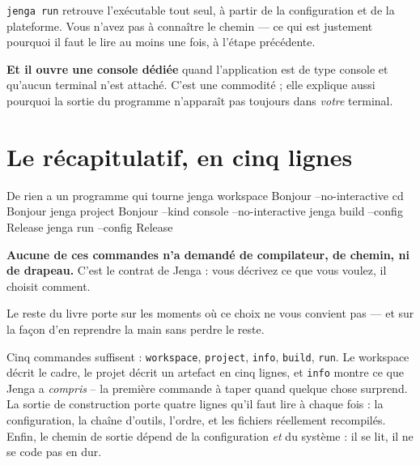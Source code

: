 \begin{nkretenir}
\texttt{jenga run} retrouve l'exécutable tout seul, à partir de la configuration
et de la plateforme. Vous n'avez pas à connaître le chemin --- ce qui est
justement pourquoi il faut le lire au moins une fois, à l'étape précédente.

\textbf{Et il ouvre une console dédiée} quand l'application est de type console
et qu'aucun terminal n'est attaché. C'est une commodité ; elle explique aussi
pourquoi la sortie du programme n'apparaît pas toujours dans \emph{votre}
terminal.
\end{nkretenir}

\section{Le récapitulatif, en cinq lignes}

\begin{nkcode}{De rien a un programme qui tourne}
jenga workspace Bonjour --no-interactive
cd Bonjour
jenga project Bonjour --kind console --no-interactive
jenga build --config Release
jenga run   --config Release
\end{nkcode}

\begin{nkretenir}
\textbf{Aucune de ces commandes n'a demandé de compilateur, de chemin, ni de
drapeau.} C'est le contrat de Jenga : vous décrivez ce que vous voulez, il
choisit comment.

Le reste du livre porte sur les moments où ce choix ne vous convient pas --- et
sur la façon d'en reprendre la main sans perdre le reste.
\end{nkretenir}

\begin{nkbilan}
Cinq commandes suffisent : \texttt{workspace}, \texttt{project}, \texttt{info},
\texttt{build}, \texttt{run}. Le workspace décrit le cadre, le projet décrit un
artefact en cinq lignes, et \texttt{info} montre ce que Jenga a \emph{compris} --
la première commande à taper quand quelque chose surprend. La sortie de
construction porte quatre lignes qu'il faut lire à chaque fois : la
configuration, la chaîne d'outils, l'ordre, et les fichiers réellement
recompilés. Enfin, le chemin de sortie dépend de la configuration \emph{et} du
système : il se lit, il ne se code pas en dur.
\end{nkbilan}

